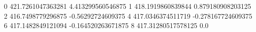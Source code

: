 0 421.7261047363281 4.413299560546875
1 418.1919860839844 0.879180908203125
2 416.7498779296875 -0.56292724609375
4 417.0346374511719 -0.278167724609375
6 417.1482849121094 -0.164520263671875
8 417.31280517578125 0.0
